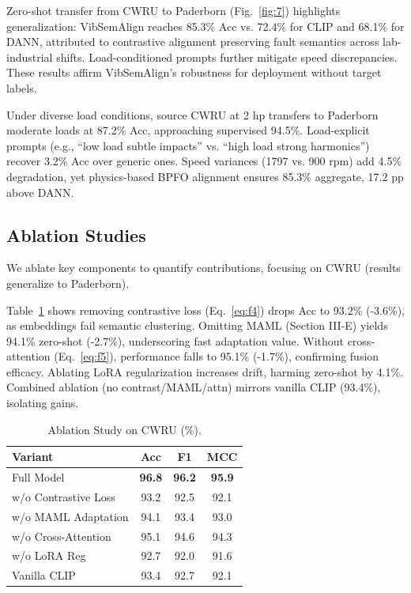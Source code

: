 Zero-shot transfer from CWRU to Paderborn (Fig.~\ref{fig:7}) highlights generalization: VibSemAlign reaches 85.3\% Acc vs. 72.4\% for CLIP and 68.1\% for DANN, attributed to contrastive alignment preserving fault semantics across lab-industrial shifts. Load-conditioned prompts further mitigate speed discrepancies. These results affirm VibSemAlign's robustness for deployment without target labels.

Under diverse load conditions, source CWRU at 2 hp transfers to Paderborn moderate loads at 87.2\% Acc, approaching supervised 94.5\%. Load-explicit prompts (e.g., ``low load subtle impacts'' vs. ``high load strong harmonics'') recover 3.2\% Acc over generic ones. Speed variances (1797 vs. 900 rpm) add 4.5\% degradation, yet physics-based BPFO alignment ensures 85.3\% aggregate, 17.2 pp above DANN.

\subsection{Ablation Studies}

We ablate key components to quantify contributions, focusing on CWRU (results generalize to Paderborn).

Table~\ref{tab:vi} shows removing contrastive loss (Eq.~\ref{eq:f4}) drops Acc to 93.2\% (-3.6\%), as embeddings fail semantic clustering. Omitting MAML (Section III-E) yields 94.1\% zero-shot (-2.7\%), underscoring fast adaptation value. Without cross-attention (Eq.~\ref{eq:f5}), performance falls to 95.1\% (-1.7\%), confirming fusion efficacy. Ablating LoRA regularization increases drift, harming zero-shot by 4.1\%. Combined ablation (no contrast/MAML/attn) mirrors vanilla CLIP (93.4\%), isolating gains.

\begin{table}[t]
\centering
\caption{Ablation Study on CWRU (\%).}
\label{tab:vi}
\begin{tabular}{@{}lccc@{}}
\toprule
Variant & Acc & F1 & MCC \\
\midrule
Full Model & \textbf{96.8} & \textbf{96.2} & \textbf{95.9} \\
w/o Contrastive Loss & 93.2 & 92.5 & 92.1 \\
w/o MAML Adaptation & 94.1 & 93.4 & 93.0 \\
w/o Cross-Attention & 95.1 & 94.6 & 94.3 \\
w/o LoRA Reg & 92.7 & 92.0 & 91.6 \\
\midrule
Vanilla CLIP & 93.4 & 92.7 & 92.1 \\
\bottomrule
\end{tabular}
\end{table}

